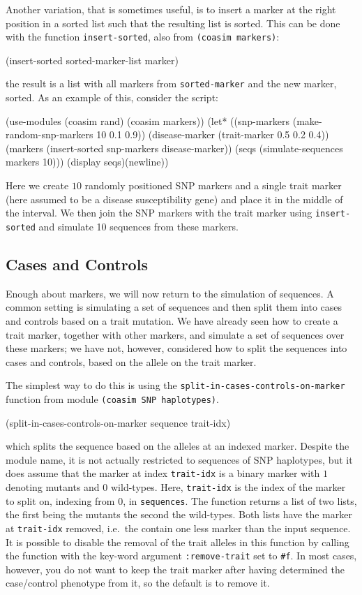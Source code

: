 \documentclass{manual}
\begin{document}
\begin{empfile}
Another variation, that is sometimes useful, is to insert a marker at
the right position in a sorted list such that the resulting list is
sorted.  This can be done with the function \texttt{insert-sorted},
also from \texttt{(coasim markers)}:
\begin{code}
(insert-sorted sorted-marker-list marker)
\end{code}
the result is a list with all markers from \texttt{sorted-marker} and
the new marker, sorted.  As an example of this, consider the script:
\begin{code}
(use-modules (coasim rand) (coasim markers))
(let* ((snp-markers    (make-random-snp-markers   10 0.1 0.9))
       (disease-marker (trait-marker 0.5 0.2 0.4))
       (markers (insert-sorted snp-markers disease-marker))
       (seqs (simulate-sequences markers 10)))
  (display seqs)(newline))
\end{code}
Here we create $10$ randomly positioned SNP markers and a single trait
marker (here assumed to be a disease susceptibility gene) and place it
in the middle of the interval.  We then join the SNP markers with the
trait marker using \texttt{insert-sorted} and simulate 10 sequences
from these markers.


\subsection{Cases and Controls}
\label{sec:cases-controls}

Enough about markers, we will now return to the simulation of
sequences.  A common setting is simulating a set of sequences and then
split them into cases and controls based on a trait mutation.  We have
already seen how to create a trait marker, together with other
markers, and simulate a set of sequences over these markers; we have
not, however, considered how to split the sequences into cases and
controls, based on the allele on the trait marker.

The simplest way to do this is using the
\texttt{split-in-cases-controls-on-marker} function from module \texttt{(coasim
  SNP haplotypes)}.
\begin{code}
(split-in-cases-controls-on-marker sequence trait-idx)
\end{code}
which splits the sequence based on the alleles at an indexed marker.
Despite the module name, it is not actually restricted to sequences of
SNP haplotypes, but it does assume that the marker at index
\texttt{trait-idx} is a binary marker with $1$ denoting mutants and
$0$ wild-types.  Here, \texttt{trait-idx} is the index of the marker
to split on, indexing from $0$, in \texttt{sequences}.  The function
returns a list of two lists, the first being the mutants the second
the wild-types.  Both lists have the marker at \texttt{trait-idx}
removed, i.e.\ the contain one less marker than the input sequence.
It is possible to disable the removal of the trait alleles in this
function by calling the function with the key-word argument
\texttt{:remove-trait} set to \texttt{\#f}.  In most cases, however,
you do not want to keep the trait marker after having determined the
case/control phenotype from it, so the default is to remove it.


\end{empfile}
\end{document}
